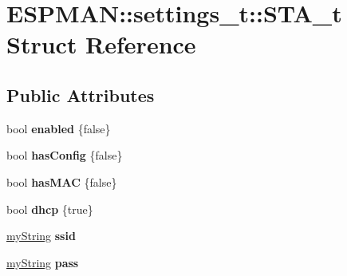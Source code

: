 \hypertarget{struct_e_s_p_m_a_n_1_1settings__t_1_1_s_t_a__t}{}\section{E\+S\+P\+M\+AN\+:\+:settings\+\_\+t\+:\+:S\+T\+A\+\_\+t Struct Reference}
\label{struct_e_s_p_m_a_n_1_1settings__t_1_1_s_t_a__t}
\subsection*{Public Attributes}
\begin{DoxyCompactItemize}
\item 
\mbox{\label{struct_e_s_p_m_a_n_1_1settings__t_1_1_s_t_a__t_a1629e9098ea8018d23e595d8050cd871}} 
bool {\bfseries enabled} \{false\}
\item 
\mbox{\label{struct_e_s_p_m_a_n_1_1settings__t_1_1_s_t_a__t_ab13e8466f7804c224fc14425eae0165a}} 
bool {\bfseries has\+Config} \{false\}
\item 
\mbox{\label{struct_e_s_p_m_a_n_1_1settings__t_1_1_s_t_a__t_ac5ca80bc6a2907b517c5303dedb86009}} 
bool {\bfseries has\+M\+AC} \{false\}
\item 
\mbox{\label{struct_e_s_p_m_a_n_1_1settings__t_1_1_s_t_a__t_a80a48aa98000550645554c119a8dd1b5}} 
bool {\bfseries dhcp} \{true\}
\item 
\mbox{\label{struct_e_s_p_m_a_n_1_1settings__t_1_1_s_t_a__t_a1c4226b0b842943ca037273746a552ce}} 
\hyperlink{class_e_s_p_m_a_n_1_1my_string}{my\+String} {\bfseries ssid}
\item 
\mbox{\label{struct_e_s_p_m_a_n_1_1settings__t_1_1_s_t_a__t_a338bfbdb39021a7f4b008a60dd2b763e}} 
\hyperlink{class_e_s_p_m_a_n_1_1my_string}{my\+String} {\bfseries pass}
\item 
\mbox{\label{struct_e_s_p_m_a_n_1_1settings__t_1_1_s_t_a__t_a7a8072be2bf18b6330ab6431b62673b1}} 

\end{DoxyCompactItemize}
